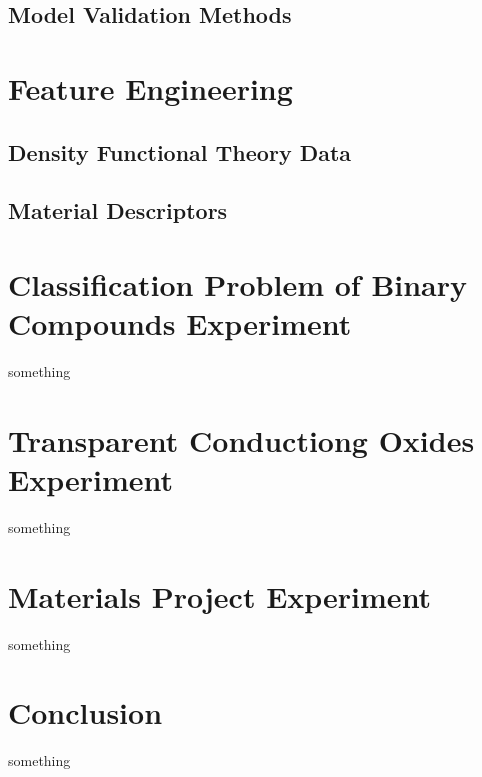 \documentclass[11pt,american]{book} %
\theoremstyle{plain}
\theoremstyle{definition}
\begin{document}
\section{Model Validation Methods}

\chapter{Feature Engineering}
\section{Density Functional Theory Data}
\section{Material Descriptors}

\chapter{Classification Problem of Binary Compounds Experiment}
something
\chapter{Transparent Conductiong Oxides Experiment}
something
\chapter{Materials Project Experiment}
something
\chapter*{Conclusion}


something

\printbibliography
\end{document}
